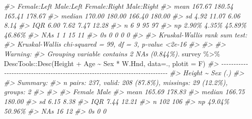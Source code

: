 \documentclass[
]{book}
\newenvironment{Shaded}{\begin{snugshade}}{\end{snugshade}}
\newcommand{\AttributeTok}[1]{\textcolor[rgb]{0.77,0.63,0.00}{#1}}
\newcommand{\CommentTok}[1]{\textcolor[rgb]{0.56,0.35,0.01}{\textit{#1}}}
\newcommand{\FunctionTok}[1]{\textcolor[rgb]{0.00,0.00,0.00}{#1}}
\newcommand{\NormalTok}[1]{#1}
\newcommand{\SpecialCharTok}[1]{\textcolor[rgb]{0.00,0.00,0.00}{#1}}
\begin{document}
\begin{Shaded}
\begin{Highlighting}[]
\CommentTok{\#\textgreater{}          Female:Left     Male:Left  Female:Right    Male:Right}
\CommentTok{\#\textgreater{} mean          167.67        180.54        165.41        178.67}
\CommentTok{\#\textgreater{} median        170.00        180.00        166.40        180.00}
\CommentTok{\#\textgreater{} sd              4.92         11.07          6.06          8.14}
\CommentTok{\#\textgreater{} IQR             6.00          7.62          7.47         12.28}
\CommentTok{\#\textgreater{} n                  6             9            95            97}
\CommentTok{\#\textgreater{} np             2.90\%         4.35\%        45.89\%        46.86\%}
\CommentTok{\#\textgreater{} NAs                1             1            15            11}
\CommentTok{\#\textgreater{} 0s                 0             0             0             0}
\CommentTok{\#\textgreater{} }
\CommentTok{\#\textgreater{} Kruskal{-}Wallis rank sum test:}
\CommentTok{\#\textgreater{}   Kruskal{-}Wallis chi{-}squared = 99, df = 3, p{-}value \textless{}2e{-}16}
\CommentTok{\#\textgreater{} }
\CommentTok{\#\textgreater{} }
\CommentTok{\#\textgreater{} Warning:}
\CommentTok{\#\textgreater{}   Grouping variable contains 2 NAs (0.844\%).}
\NormalTok{survey }\SpecialCharTok{\%\textgreater{}\%}\NormalTok{  DescTools}\SpecialCharTok{::}\FunctionTok{Desc}\NormalTok{(Height }\SpecialCharTok{+}\NormalTok{ Age }\SpecialCharTok{\textasciitilde{}}\NormalTok{ Sex }\SpecialCharTok{*}\NormalTok{ W.Hnd, }\AttributeTok{data=}\NormalTok{., }\AttributeTok{plotit =}\NormalTok{ F)}
\CommentTok{\#\textgreater{} {-}{-}{-}{-}{-}{-}{-}{-}{-}{-}{-}{-}{-}{-}{-}{-}{-}{-}{-}{-}{-}{-}{-}{-}{-}{-}{-}{-}{-}{-}{-}{-}{-}{-}{-}{-}{-}{-}{-}{-}{-}{-}{-}{-}{-}{-}{-}{-}{-}{-}{-}{-}{-}{-}{-}{-}{-}{-}{-}{-}{-}{-}{-}{-}{-}{-}{-}{-}{-}{-}{-}{-}{-}{-}{-}{-}{-}{-} }
\CommentTok{\#\textgreater{} Height \textasciitilde{} Sex (.)}
\CommentTok{\#\textgreater{} }
\CommentTok{\#\textgreater{} Summary: }
\CommentTok{\#\textgreater{} n pairs: 237, valid: 208 (87.8\%), missings: 29 (12.2\%), groups: 2}
\CommentTok{\#\textgreater{} }
\CommentTok{\#\textgreater{}                       }
\CommentTok{\#\textgreater{}         Female    Male}
\CommentTok{\#\textgreater{} mean    165.69  178.83}
\CommentTok{\#\textgreater{} median  166.75  180.00}
\CommentTok{\#\textgreater{} sd        6.15    8.38}
\CommentTok{\#\textgreater{} IQR       7.44   12.21}
\CommentTok{\#\textgreater{} n          102     106}
\CommentTok{\#\textgreater{} np      49.04\%  50.96\%}
\CommentTok{\#\textgreater{} NAs         16      12}
\CommentTok{\#\textgreater{} 0s           0       0}

\end{Highlighting}
\end{Shaded}
\end{document}

